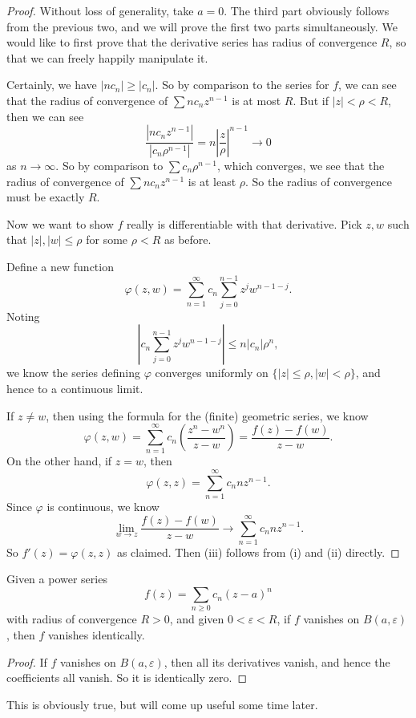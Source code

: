 \documentclass[a4paper]{article}
\begin{document}
\begin{proof}
  Without loss of generality, take $a = 0$. The third part obviously follows from the previous two, and we will prove the first two parts simultaneously. We would like to first prove that the derivative series has radius of convergence $R$, so that we can freely happily manipulate it.

  Certainly, we have $|n c_n| \geq |c_n|$. So by comparison to the series for $f$, we can see that the radius of convergence of $\sum n c_n z^{n - 1}$ is at most $R$. But if $|z| < \rho < R$, then we can see
  \[
    \frac{|n c_n z^{n - 1}|}{|c_n \rho^{n - 1}|} = n \left|\frac{z}{\rho}\right|^{n - 1} \to 0
  \]
  as $n \to \infty$. So by comparison to $\sum c_n \rho^{n - 1}$, which converges, we see that the radius of convergence of $\sum n c_n z^{n - 1}$ is at least $\rho$. So the radius of convergence must be exactly $R$.

  Now we want to show $f$ really is differentiable with that derivative. Pick $z, w$ such that $|z|, |w| \leq \rho$ for some $\rho < R$ as before.

  Define a new function
  \[
    \varphi (z, w) = \sum_{n = 1}^\infty c_n \sum_{j = 0}^{n - 1} z^j w^{n - 1 - j}.
  \]
  Noting
  \[
    \left|c_n \sum_{j = 0}^{n - 1} z^j w^{n - 1 - j}\right| \leq n |c_n| \rho^n,
  \]
  we know the series defining $\varphi$ converges uniformly on $\{|z| \leq \rho, |w| < \rho\}$, and hence to a continuous limit.

  If $z \not= w$, then using the formula for the (finite) geometric series, we know
  \[
    \varphi(z, w) = \sum_{n = 1}^\infty c_n\left(\frac{z^n - w^n}{z - w}\right) = \frac{f(z) - f(w)}{z - w}.
  \]
  On the other hand, if $z = w$, then
  \[
    \varphi(z, z) = \sum_{n = 1}^\infty c_n n z^{n - 1}.
  \]
  Since $\varphi$ is continuous, we know
  \[
    \lim_{w \to z} \frac{f(z) - f(w)}{z - w} \to \sum_{n = 1}^\infty c_n nz^{n - 1}.
  \]
  So $f'(z) = \varphi(z, z)$ as claimed. Then (iii) follows from (i) and (ii) directly.
\end{proof}

\begin{cor}
  Given a power series
  \[
    f(z) = \sum_{n \geq 0} c_n (z - a)^n
  \]
  with radius of convergence $R > 0$, and given $0 < \varepsilon < R$, if $f$ vanishes on $B(a, \varepsilon)$, then $f$ vanishes identically.
\end{cor}

\begin{proof}
  If $f$ vanishes on $B(a, \varepsilon)$, then all its derivatives vanish, and hence the coefficients all vanish. So it is identically zero.
\end{proof}
This is obviously true, but will come up useful some time later.
\end{document}
